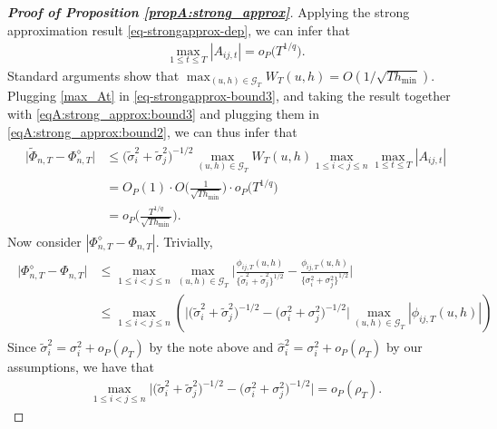 \begin{proof}[\textnormal{\textbf{Proof of Proposition \ref{propA:strong_approx}}}]
Applying the strong approximation result \eqref{eq-strongapprox-dep}, we can infer that
\begin{align}\label{max_At}
\max_{1 \le t \le T} |A_{ij, t}|  =o_P\big(T^{1/q}\big). 
\end{align}
Standard arguments show that $\max_{(u,h) \in \mathcal{G}_T} W_T(u,h) = O( 1/\sqrt{Th_{\min}} )$. Plugging \eqref{max_At} in \eqref{eq-strongapprox-bound3}, and taking the result together with \eqref{eqA:strong_approx:bound3} and plugging them in \eqref{eqA:strong_approx:bound2}, we can thus infer that 
\begin{align}\label{eq-strongapprox-bound4}
\begin{split}
\big| \widetilde{\Phi}_{n, T} - \Phi_{n, T}^{\diamond} \big| &\le \big(\widetilde{\sigma}_i^2 + \widetilde{\sigma}_j^2 \big)^{-1/2}  \max_{(u,h) \in \mathcal{G}_T} W_T(u, h) \max_{1\le i < j \le n}\max_{1\le t \le T} |A_{ij, t}|\\
& = O_P(1) \cdot O\Big(\frac{1}{\sqrt{Th_{\min}}} \Big) \cdot o_P\big(T^{1/q}\big)\\
&= o_P\Big( \frac{T^{1/q}}{\sqrt{Th_{\min}}} \Big).
\end{split}
\end{align}
Now consider $|\Phi_{n, T}^{\diamond} - \Phi_{n, T}|$. Trivially,
\begin{align}\label{eqA:strong_approx:bound5}
\begin{split}
\big| \Phi_{n, T}^{\diamond} - \Phi_{n, T} \big| &\le \max_{1\leq i< j \leq n}\max_{(u,h) \in \mathcal{G}_T} \Big|\frac{\phi_{ij, T}(u,h)}{\{\widetilde{\sigma}_i^2 + \widetilde{\sigma}_j^2 \}^{1/2}} - \frac{\phi_{ij, T}(u,h)}{\{{\sigma}_i^2 + {\sigma}_j^2 \}^{1/2}}\Big|\\
&\le\max_{1 \le i < j \le n} \left( \Big|\big(\widetilde{\sigma}_i^2 + \widetilde{\sigma}_j^2 \big)^{-1/2} - \big(\sigma_i^2 + \sigma_j^2 \big)^{-1/2}\Big| \max_{(u,h) \in \mathcal{G}_T} \left|\phi_{ij,T}(u,h)\right|\right)
\end{split}
\end{align}
Since $\widetilde{\sigma}_i^2 = \sigma_i^2 + o_P(\rho_T)$ by the note above and $\widehat{\sigma}_i^2 = \sigma_i^2 + o_P(\rho_T)$ by our assumptions, we have that 
\begin{align}\label{eqA:strong_approx:bound6}
\max_{1 \le i < j \le n} \Big|\big(\widetilde{\sigma}_i^2 + \widetilde{\sigma}_j^2 \big)^{-1/2} - \big(\sigma_i^2 + \sigma_j^2 \big)^{-1/2}\Big| = o_P(\rho_T).
\end{align}

\end{proof}
